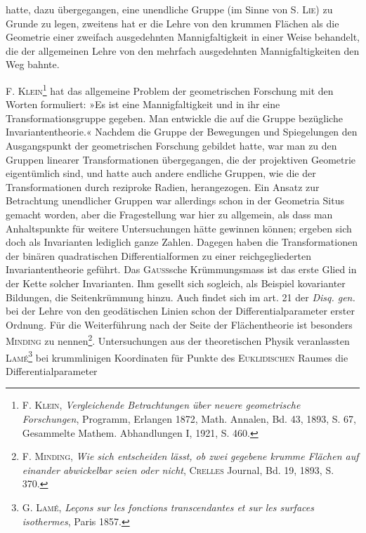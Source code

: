 hatte, dazu übergegangen, eine unendliche Gruppe (im Sinne von \textsc{S. Lie}) zu
Grunde zu legen, zweitens hat er die Lehre von den krummen Flächen als
die Geometrie einer zweifach ausgedehnten Mannigfaltigkeit in einer Weise
behandelt, die der allgemeinen Lehre von den mehrfach ausgedehnten Mannigfaltigkeiten
den Weg bahnte.
\par
\textsc{F. Klein}\footnote{\textsc{F. Klein}, \textit{Vergleichende Betrachtungen über neuere geometrische Forschungen}, Programm, Erlangen 1872, Math. Annalen, Bd. 43, 1893, S. 67, Gesammelte Mathem. Abhandlungen I, 1921, S. 460.} hat das allgemeine Problem der geometrischen Forschung mit
den Worten formuliert: »Es ist eine Mannigfaltigkeit und in ihr eine Transformationsgruppe
gegeben. Man entwickle die auf die Gruppe bezügliche
Invariantentheorie.« Nachdem die Gruppe der Bewegungen und Spiegelungen
den Ausgangspunkt der geometrischen Forschung gebildet hatte, war man zu
den Gruppen linearer Transformationen übergegangen, die der projektiven
Geometrie eigentümlich sind, und hatte auch andere endliche Gruppen, wie die
der Transformationen durch reziproke Radien, herangezogen. Ein Ansatz zur
Betrachtung unendlicher Gruppen war allerdings schon in der Geometria Situs
gemacht worden, aber die Fragestellung war hier zu allgemein, als dass man
Anhaltspunkte für weitere Untersuchungen hätte gewinnen können; ergeben
sich doch als Invarianten lediglich ganze Zahlen. Dagegen haben die Transformationen
der binären quadratischen Differentialformen zu einer reichgegliederten
Invariantentheorie geführt. Das \textsc{Gauss}sche Krümmungsmass ist
das erste Glied in der Kette solcher Invarianten. Ihm gesellt sich sogleich,
als Beispiel kovarianter Bildungen, die Seitenkrümmung hinzu. Auch findet
\clearpage{}\setcounter{footnote}{0}
\noindent sich im art. 21 der \textit{Disq. gen.} bei der Lehre von den geodätischen Linien
schon der Differentialparameter erster Ordnung. Für die Weiterführung nach
der Seite der Flächentheorie ist besonders \textsc{Minding} zu nennen\footnote{\textsc{F. Minding}, \textit{Wie sich entscheiden lässt, ob zwei gegebene krumme Flächen auf einander abwickelbar seien oder nicht}, \textsc{Crelles} Journal, Bd. 19, 1893, S. 370.}. Untersuchungen
aus der theoretischen Physik veranlassten \textsc{Lamé}\footnote{\textsc{G. Lamé}, \textit{Leçons sur les fonctions transcendantes et sur les surfaces isothermes}, Paris 1857.} bei krummlinigen
Koordinaten für Punkte des \textsc{Euklidischen} Raumes die Differentialparameter
